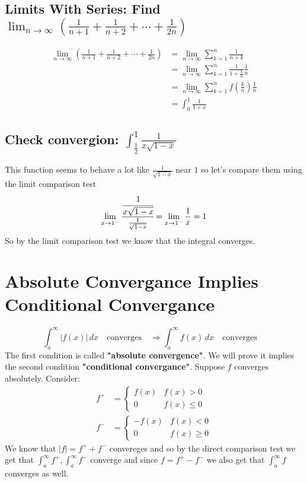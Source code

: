 \documentclass{article}
\begin{document}
	\subsection{Limits With Series: Find 
	$\lim_{n\to\infty}
	{\left(\frac 1{n+1} + \frac 1{n+2} + \cdots + \frac {1}{2n}\right)}$}
	
	\begin{align*}
	\lim_{n\to\infty}
	{\left(\frac {1}{n+1} + \frac {1}{n+2} + \cdots + \frac {1}{2n}\right)} 
	&= \lim_{n\to\infty}
	{\sum_{k=1}^{n}{\frac {1}{n+k}}} 
	\\
	&= \lim_{n\to\infty}
	{\sum_{k=1}^{n}{\frac {1}{1 + \frac {k}{n}}\frac {1}{n}}} 
	\\
	&= \lim_{n\to\infty}
	{\sum_{k=1}^{n} {f(\frac {k}{n})\frac {1}{n}}} 
	\\
	&= \int_{0}^{1}{\frac{1}{1+x}}
	\end{align*}
	
	\subsection{Check convergion: $\int_{\frac {1}{2}}^{1}{\frac{1}{x\sqrt{1-x}}}$}
	This function seems to behave a lot like $\frac{1}{\sqrt{1-x}}$ near $1$ 
	so let's compare them using the limit comparison test
	\[
		\lim_{x\to 1^-}{\cfrac{\cfrac{1}{x\sqrt{1-x}}}{\frac{1}{\sqrt{1-x}}}}
		= \lim_{x\to 1^-}{\frac{1}{x}} = 1
	\]
	So by the limit comparison test we know that the integral converges.
	
	\newpage
	
	\section{Absolute Convergance Implies Conditional Convergance}
	\[
		\int_a^\infty|f(x)|\,dx \quad\mathrm{converges}\quad
		\Rightarrow
	    \int_a^\infty {f(x)}\,dx \quad\mathrm{converges}\quad
	\]
	The first condition is called \textbf{"absolute convergence"}. 
	We will prove it implies the second condition \textbf{"conditional convergance"}. 
	Suppose $f$ converges absolutely. Consider:
	\begin{align*}
		f^+&=
		\begin{cases}
  			f(x)  & f(x) > 0 \\
  			0  & f(x) \le 0
	\end{cases}
	\\
		f^-&=
		\begin{cases}
  			-f(x)  & f(x) < 0 \\
  			0  & f(x) \ge 0
		\end{cases}
	\end{align*}
	We know that $|f|=f^++f^-$ convereges and so by the direct comparison test we get that 
	$\int_a^\infty f^+,\int_a^\infty f^-$ converge and since 
	$f = f^+ - f^-$ we also get that $\int_a^\infty f$ converges as well.
	
\end{document}
